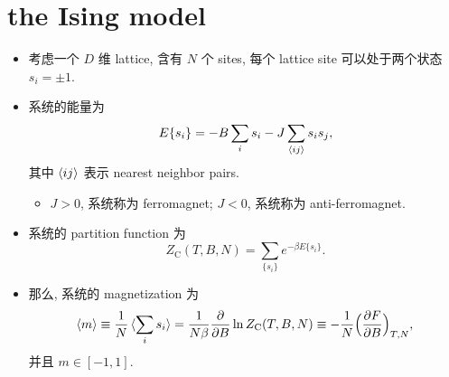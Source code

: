 \chapter{the Ising model}
\begin{itemize}
	\item 考虑一个 $D$ 维 lattice, 含有 $N$ 个 sites, 每个 lattice site 可以处于两个状态 $s_i = \pm 1$.
	
	\item 系统的能量为
	\begin{equation}
		E\{s_i\} = - B \sum_i s_i - J \sum_{\braket{i j}} s_i s_j,
	\end{equation}
	其中 $\braket{i j}$ 表示 nearest neighbor pairs.
	\begin{itemize}
		\item $J > 0$, 系统称为 ferromagnet; $J < 0$, 系统称为 anti-ferromagnet.
	\end{itemize}
	
	\item 系统的 partition function 为
	\begin{equation}
		Z_\text{C}(T, B, N) = \sum_{\{s_i\}} e^{- \beta E\{s_i\}}.
	\end{equation}
	
	\item 那么, 系统的 magnetization 为
	\begin{equation}
		\braket{m} \equiv \frac{1}{N} \braket{\sum_i s_i} = \frac{1}{N \beta} \frac{\partial}{\partial B} \ln Z_\text{C}(T, B, N) \equiv - \frac{1}{N} \Big( \frac{\partial F}{\partial B} \Big)_{T, N},
	\end{equation}
	并且 $m \in [- 1, 1]$.
\end{itemize}


